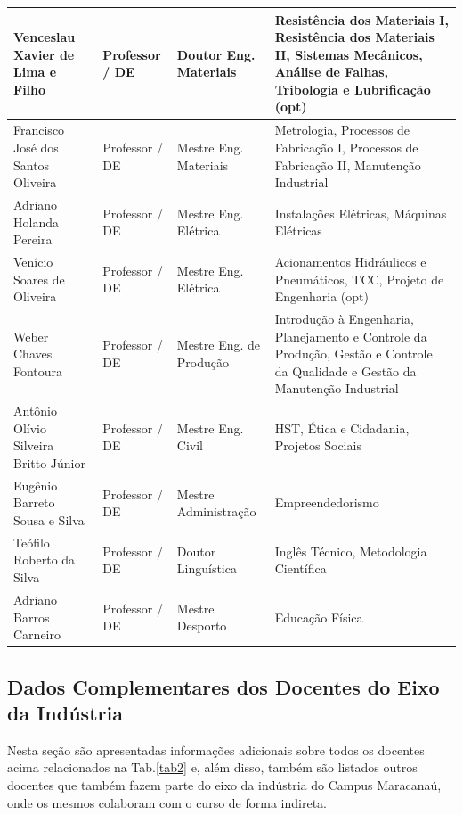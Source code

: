 \documentclass{paper}
\begin{document}
\begin{longtable}{|p{3.0cm}|p{2.5cm}|p{2.0cm}|p{6.3cm}|}
    Venceslau Xavier de Lima e Filho   &  Professor / DE  &  Doutor Eng. Materiais  &  Resistência dos Materiais I, Resistência dos Materiais II, Sistemas Mecânicos, Análise de Falhas, Tribologia e Lubrificação (opt) \\ \hline
    Francisco José dos Santos Oliveira   &  Professor / DE  &  Mestre Eng. Materiais &  Metrologia, Processos de Fabricação I, Processos de Fabricação II, Manutenção Industrial \\ \hline
    Adriano Holanda Pereira & Professor / DE  &  Mestre Eng. Elétrica  &  Instalações Elétricas, Máquinas Elétricas  \\ \hline
    Venício Soares de Oliveira  &  Professor / DE &  Mestre Eng. Elétrica  &  Acionamentos Hidráulicos e Pneumáticos, TCC, Projeto de Engenharia (opt)    \\ \hline
    Weber Chaves Fontoura  &  Professor / DE &  Mestre Eng. de Produção  &  Introdução à Engenharia, Planejamento e Controle da Produção, Gestão e Controle da Qualidade e Gestão da Manutenção Industrial \\ \hline
    Antônio Olívio Silveira Britto Júnior & Professor / DE  &  Mestre Eng. Civil  &  HST, Ética e Cidadania, Projetos Sociais  \\ \hline
    Eugênio Barreto Sousa e Silva & Professor / DE  &  Mestre Administração &  Empreendedorismo \\ \hline
    Teófilo Roberto da Silva & Professor / DE  &  Doutor Linguística &  Inglês Técnico, Metodologia Científica \\ \hline
    Adriano Barros Carneiro &  Professor / DE  &  Mestre Desporto  &  Educação Física \\ \hline
   \end{longtable}
\fi



\subsection{Dados Complementares dos Docentes do Eixo da Indústria}

Nesta seção são apresentadas informações adicionais sobre todos os docentes acima relacionados na Tab.\ref{tab2} e, além disso, também são listados outros docentes que também fazem parte do eixo da indústria do Campus Maracanaú, onde os mesmos colaboram com o curso de forma indireta.
\end{document}
